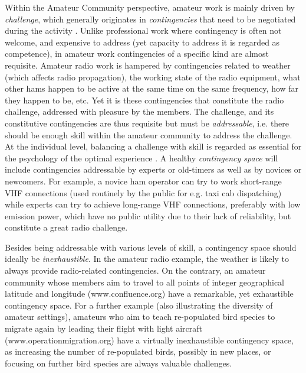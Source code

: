\documentclass{acm_proc_article-sp}
\begin{document}
Within the Amateur Community perspective, amateur work is mainly driven by \textit{challenge}, which generally originates in \textit{contingencies} that need to be negotiated during the activity \cite{bogdan_bowers07}. Unlike professional work where contingency is often not welcome, and expensive to address (yet capacity to address it is regarded as competence), in amateur work contingencies of a specific kind are almost requisite. Amateur radio work is hampered by contingencies related to weather (which affects radio propagation), the working state of the radio equipment, what other hams happen to be active at the same time on the same frequency, how far they happen to be, etc. Yet it is these contingencies that constitute the radio challenge, addressed with pleasure by the members. The challenge, and its constitutive contingencies are thus requisite but must be \textit{addressable}, i.e. there should be enough skill within  the amateur community to address the challenge. At the individual level, balancing a challenge with skill is regarded as essential for the psychology of the optimal experience \cite{csik90}. A healthy \textit{contingency space} will include contingencies addressable by experts or old-timers as well as by novices or newcomers. For example, a novice ham operator can try to work short-range VHF connections (used routinely by the public for e.g. taxi cab dispatching)  while experts can try to achieve long-range VHF connections, preferably with low emission power, which have no public utility due to their lack of reliability, but constitute a great radio challenge.  

Besides being addressable with various levels of skill, a contingency space should ideally be \textit{inexhaustible}. In the amateur radio example, the weather is likely to always provide radio-related contingencies. On the contrary, an amateur community whose members aim to travel to all points of integer geographical latitude and longitude (www.confluence.org) have a remarkable, yet exhaustible contingency space. For a further example (also illustrating the diversity of amateur settings), amateurs who aim to teach re-populated bird species to migrate again by leading their flight with light aircraft (www.operationmigration.org) have a virtually inexhaustible contingency space, as increasing the number of re-populated birds, possibly in new places, or focusing on further bird species are always valuable challenges.
\end{document}
